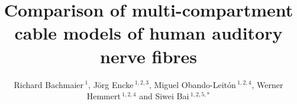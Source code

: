 \documentclass[utf8]{frontiersSCNS} %
\def\firstAuthorLast{Sample {et~al.}} %
\def\Authors{Richard Bachmaier\,$^{1}$, Jörg Encke\,$^{1,2,3}$, Miguel Obando-Leitón\,$^{1,2,4}$, Werner Hemmert\,$^{1,2,4}$ and Siwei Bai\,$^{1,2,5,*}$}
\begin{document}
\onecolumn
{}

\title[Running Title]{Comparison of multi-compartment cable models of human auditory nerve fibres} 

\author[\firstAuthorLast ]{\Authors} %
\address{} %
\correspondance{} %

\extraAuth{}%


\maketitle
\end{document}

